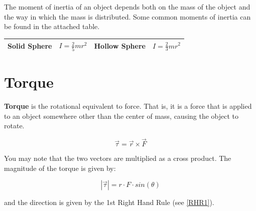 	The moment of inertia of an object depends both on the mass of the object and the way in which the mass is distributed.  Some common moments of inertia can be found in the attached table.  
	
	\begin{longtable}{|c c|c c |}
		\hline
		Solid Sphere & $I=\frac{2}{5}mr^2$ & Hollow Sphere & $I = \frac{2}{3} m r^2 $  \\	
		\hline
		
	\end{longtable}
	
	
	
	\section{Torque}
	\textbf{Torque} is the rotational equivalent to force.  That is, it is a force that is applied to an object somewhere other than the center of mass, causing the object to rotate.  
	
	
		\begin{mdframed}[backgroundcolor=orange!20!white]
		\begin{equation}
			\vec{\tau} = \vec{r} \times \vec{F}
			\label{equation:torque}
		\end{equation}
	\end{mdframed}
	
	
	You may note that the two vectors are multiplied as a cross product.  The magnitude of the torque is given by:
	
		\begin{mdframed}[backgroundcolor=orange!20!white]
		\begin{equation}
			|\vec{\tau}| = r \cdot F \cdot sin (\theta)
			\label{equation:torquemagnitude}
		\end{equation}
	\end{mdframed}
	
	and the direction is given by the 1st Right Hand Rule (see \cref{RHR1}).
	
